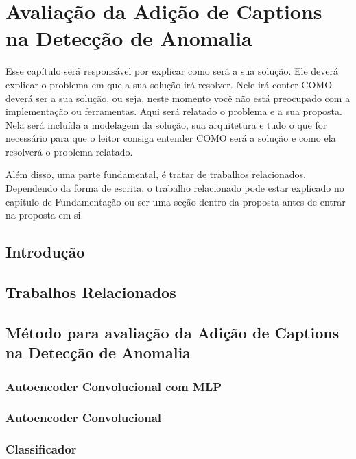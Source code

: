 \chapter{Avaliação da Adição de Captions na Detecção de
Anomalia}\label{chp:PROPOSTA}

Esse capítulo será responsável por explicar como será a sua solução.
Ele deverá explicar o problema em que a sua solução irá resolver.
Nele irá conter COMO deverá ser a sua solução, ou seja, neste momento você não está preocupado com a implementação ou ferramentas.
Aqui será relatado o problema e a sua proposta. 
Nela será incluída a modelagem da solução, sua arquitetura e tudo o que for necessário para que o leitor consiga entender COMO será a solução e como ela resolverá o problema relatado.

Além disso, uma parte fundamental, é tratar de trabalhos relacionados. Dependendo da forma de escrita, o trabalho relacionado pode estar explicado no capítulo de Fundamentação ou ser uma seção dentro da proposta antes de entrar na proposta em si.

\section{Introdução}

\section{Trabalhos Relacionados}

\section{Método para avaliação da Adição de Captions na Detecção de Anomalia}

\subsection{Autoencoder Convolucional com MLP}
\subsection{Autoencoder Convolucional}
\subsection{Classificador}

